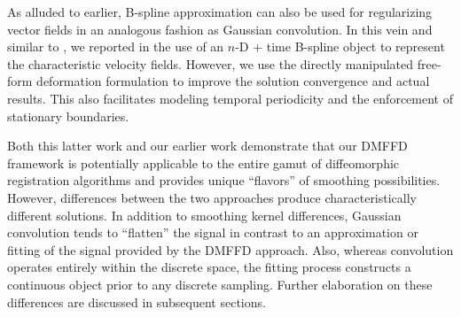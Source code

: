 \documentclass{frontiersSCNS}
\begin{document}
As alluded to earlier, B-spline approximation can also be used
for regularizing vector fields in an analogous fashion as
Gaussian convolution.  In this vein and similar to
\cite{de-craene2011}, we reported in \cite{tustison2012a,tustison2012}
the use of an $n$-D + time B-spline object to
represent the characteristic velocity fields.  However, we use the
directly manipulated free-form deformation formulation to improve the solution convergence and actual results.  This also facilitates modeling
temporal periodicity and the enforcement of stationary boundaries.

Both this latter work \citep{tustison2012a} and our earlier work
\citep{tustison2009} demonstrate that our DMFFD framework is potentially
applicable to the
entire gamut of diffeomorphic registration algorithms and provides
unique ``flavors'' of smoothing possibilities.  However, differences
between the two approaches produce characteristically different
solutions.  In addition to
smoothing kernel differences, Gaussian
convolution tends to ``flatten'' the signal in contrast to an
approximation or fitting of the signal provided by the DMFFD
approach.  Also, whereas
convolution operates entirely within the discrete space,
the fitting process constructs a continuous object prior
to any discrete sampling.  Further elaboration on these differences
are discussed in subsequent sections.
\end{document}
